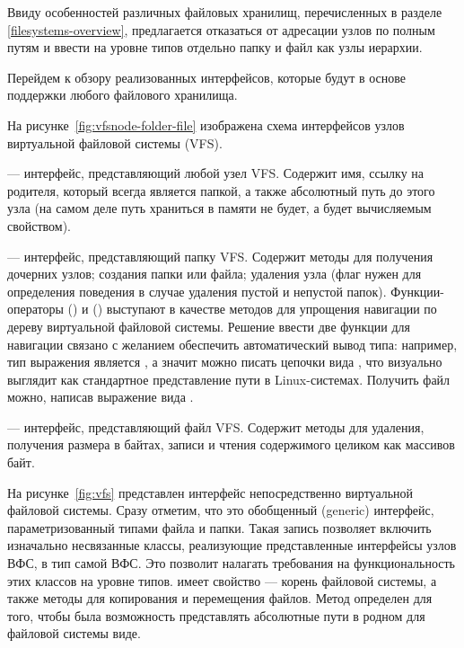     Ввиду особенностей различных файловых хранилищ, перечисленных в разделе \ref{filesystems-overview}, предлагается отказаться от адресации узлов по полным путям и ввести на уровне типов отдельно папку и файл как узлы иерархии.

    Перейдем к обзору реализованных интерфейсов, которые будут в основе поддержки любого файлового хранилища.
    
    На рисунке~\ref{fig:vfsnode-folder-file} изображена схема интерфейсов узлов виртуальной файловой системы (VFS). 
    
     --- интерфейс, представляющий любой узел VFS. Содержит имя, ссылку на родителя, который всегда является папкой, а также абсолютный путь до этого узла (на самом деле путь храниться в памяти не будет, а будет вычисляемым свойством\cite{kotlin-computed-property}).

     --- интерфейс, представляющий папку VFS. Содержит методы для получения дочерних узлов; создания папки или файла; удаления узла (флаг  нужен для определения поведения в случае удаления пустой и непустой папок). Функции-операторы  (\code{/}) и  (\code{\%}) выступают в качестве методов для упрощения навигации по дереву виртуальной файловой системы. Решение ввести две функции для навигации связано с желанием обеспечить автоматический вывод типа: например, тип выражения  является , а значит можно писать цепочки вида , что визуально выглядит как стандартное представление пути в Linux-системах. Получить файл можно, написав выражение вида .
    
     --- интерфейс, представляющий файл VFS. Содержит методы для удаления, получения размера в байтах, записи и чтения содержимого целиком как массивов байт.

    На рисунке~\ref{fig:vfs} представлен интерфейс непосредственно виртуальной файловой системы. Сразу отметим, что это обобщенный (generic) интерфейс, параметризованный типами файла и папки. Такая запись позволяет включить изначально несвязанные классы, реализующие представленные интерфейсы узлов ВФС, в тип самой ВФС. Это позволит налагать требования на функциональность этих классов на уровне типов.  имеет свойство  --- корень файловой системы, а также методы для копирования и перемещения файлов. Метод  определен для того, чтобы была возможность представлять абсолютные пути в родном для файловой системы виде.

